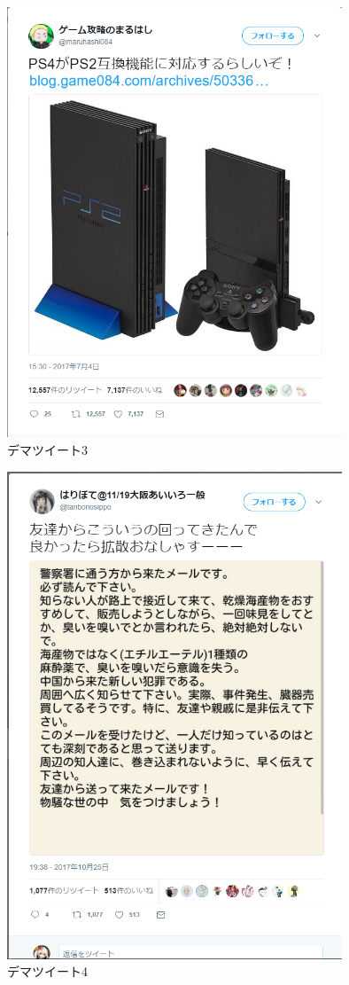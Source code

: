 \begin{figure}[htb]
\centering
\includegraphics[width=10cm]{dema3.png}
\caption{デマツイート3}\label{16}
\end{figure}
\clearpage

\begin{figure}[htb]
\centering
\includegraphics[width=10cm]{dema4.png}
\caption{デマツイート4}\label{17}
\end{figure}

